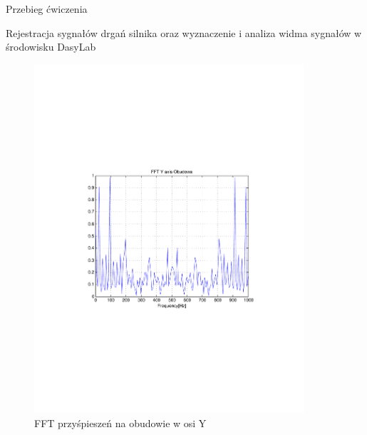 \documentclass[12pt]{article}
\begin{document}
\begin{section}{Przebieg ćwiczenia}
\begin{subsection}{Rejestracja sygnałów drgań silnika oraz wyznaczenie i
    analiza widma sygnałów w środowisku DasyLab}
\begin{figure}[!htb]
\begin{center}
                \includegraphics[trim=5cm 8.5cm 5cm
                8.5cm,width=10cm]{../res/img/a_fft_ob_y.pdf}
            \end{center}
            \caption{FFT przyśpieszeń na obudowie w osi Y}
            \label{rys:foby}
        \end{figure}
        
        \newpage
        

\end{subsection}
\end{section}
\end{document}
